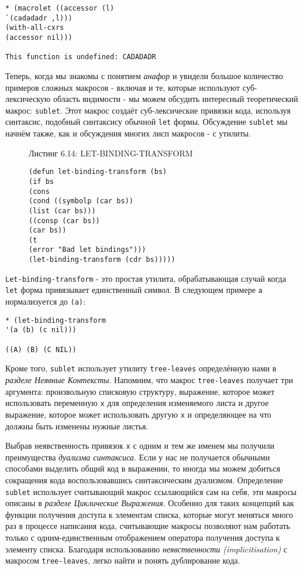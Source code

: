 \begin{verbatim}
* (macrolet ((accessor (l)
`(cadadadr ,l)))
(with-all-cxrs
(accessor nil)))

This function is undefined: CADADADR
\end{verbatim}

Теперь, когда мы знакомы с понятием \emph{анафор} и увидели большое количество примеров сложных макросов - включая и те, которые используют суб-лексическую область видимости - мы можем обсудить интересный теоретический макрос: \verb"sublet". Этот макрос создаёт суб-лексические привязки кода, используя синтаксис, подобный синтаксису обычной \verb"let" формы. Обсуждение \verb"sublet" мы начнём также, как и обсуждения многих лисп макросов - с утилиты.

\begin{figure}Листинг 6.14: LET-BINDING-TRANSFORM\label{listing_6.14}
\listbegin
\begin{verbatim}
(defun let-binding-transform (bs)
(if bs
(cons
(cond ((symbolp (car bs))
(list (car bs)))
((consp (car bs))
(car bs))
(t
(error "Bad let bindings")))
(let-binding-transform (cdr bs)))))
\end{verbatim}
\listend
\end{figure}

\verb"Let-binding-transform" - это простая утилита, обрабатывающая случай когда \verb"let" форма привязывает единственный символ. В следующем примере \verb"a" нормализуется до \verb"(a)":

\begin{verbatim}
* (let-binding-transform
'(a (b) (c nil)))

((A) (B) (C NIL))
\end{verbatim}

Кроме того, \verb"sublet" использует утилиту \verb"tree-leaves" определённую нами в \emph{разделе Неявные Контексты}. Напомним, что макрос \verb"tree-leaves" получает три аргумента: произвольную списковую структуру, выражение, которое может использовать переменную \verb"x" для определения изменяемого листа и другое выражение, которое может использовать другую \verb"x" и определяющее на что должны быть изменены нужные листья.

Выбрав неявственность привязок \verb"x" с одним и тем же именем мы получили преимущества \emph{дуализма синтаксиса}. Если у нас не получается обычными способами выделить общий код в выражении, то иногда мы можем добиться сокращения кода воспользовавшись синтаксическим дуализмом. Определение \verb"sublet" использует считывающий макрос ссылающийся сам на себя, эти макросы описаны в \emph{разделе Циклические Выражения}. Особенно для таких концепций как функции получения доступа к элементам списка, которые могут меняться много раз в процессе написания кода, считывающие макросы позволяют нам работать только с одним-единственным отображением оператора получения доступа к элементу списка. Благодаря использованию \emph{неявственности (implicitisation)} с макросом \verb"tree-leaves", легко найти и понять дублирование кода.

